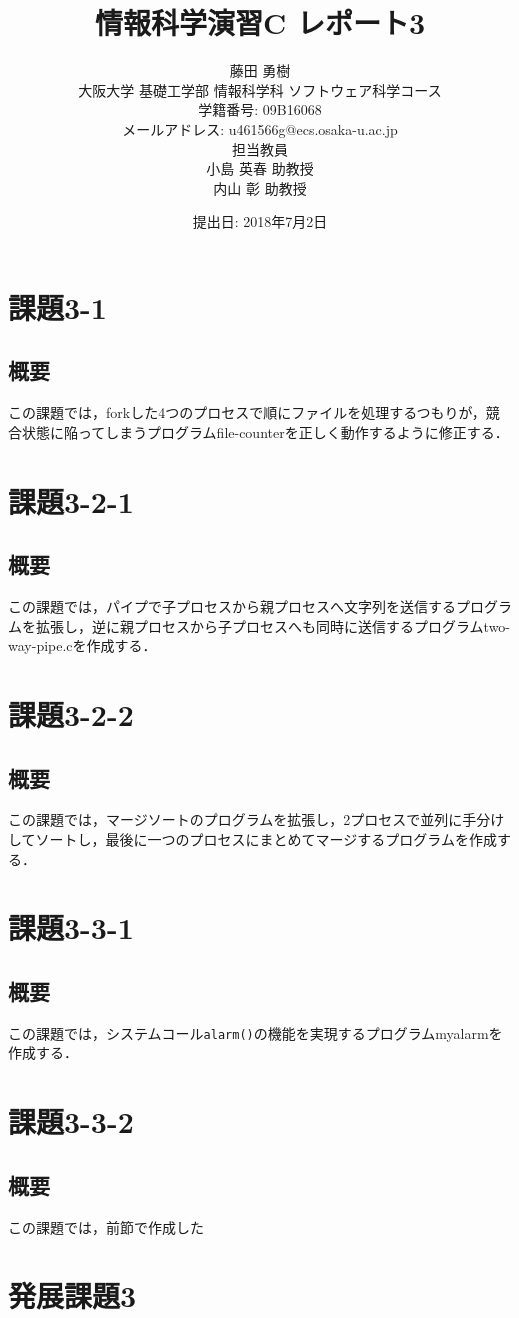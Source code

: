 \documentclass[a4j,10pt,titlepage]{jsarticle}
\title{情報科学演習C レポート3}
\author{藤田 勇樹 \\
大阪大学 基礎工学部 情報科学科 ソフトウェア科学コース\\
学籍番号: 09B16068 \\
メールアドレス: u461566g@ecs.osaka-u.ac.jp \\
担当教員\\
小島 英春 助教授 \\
内山 彰 助教授}
\date{提出日: 2018年7月2日}
\begin{document}
\maketitle
\section{課題3-1}
\subsection{概要}
この課題では，forkした4つのプロセスで順にファイルを処理するつもりが，競合状態に陥ってしまうプログラムfile-counterを正しく動作するように修正する．



\section{課題3-2-1}
\subsection{概要}
この課題では，パイプで子プロセスから親プロセスへ文字列を送信するプログラムを拡張し，逆に親プロセスから子プロセスへも同時に送信するプログラムtwo-way-pipe.cを作成する．

\section{課題3-2-2}
\subsection{概要}
この課題では，マージソートのプログラムを拡張し，2プロセスで並列に手分けしてソートし，最後に一つのプロセスにまとめてマージするプログラムを作成する．

\section{課題3-3-1}
\subsection{概要}
この課題では，システムコール\verb|alarm()|の機能を実現するプログラムmyalarmを作成する．

\section{課題3-3-2}
\subsection{概要}
この課題では，前節で作成した

\section{発展課題3}
\end{document}
